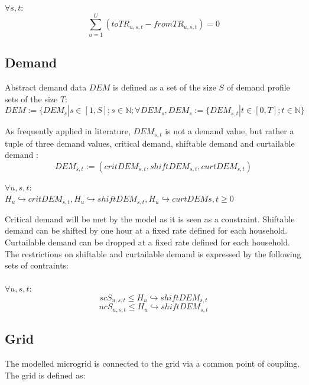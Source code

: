 \documentclass[
	11pt,								%
	DIV10,								%
	a4paper,         					%
	oneside,							%
	headheight=20pt,					%
	footheight=20pt,					%
    parskip=full,						%
    listof=totoc,						%
	bibliography=totoc,					%
	index=totoc,						%
]{scrartcl}
\begin{document}
$\forall s,t$:
\begin{equation}
	\sum_{u = 1}^{U}(toTR_{u,s,t}-fromTR_{u,s,t}) = 0
\end{equation}





\subsection{Demand}
Abstract demand data $DEM$ is defined as a set of the size $S$ of demand profile sets of the size $T$:
\begin{equation}
 DEM:= \{DEM_s | s \in [1,S]; s\in \mathbb{N}; \forall DEM_s, DEM_s := \{DEM_{s,t} | t\in [0,T]; t \in \mathbb{N}\}
\end{equation}

As frequently applied in literature, $DEM_{s,t}$ is not a demand value, but rather a tuple of three demand values, critical demand, shiftable demand and curtailable demand \cite{silvente2015rolling}\cite{zhang2015optimal}\cite{8216436}\cite{7972908} : \\
\begin{equation}
 DEM_{s,t}:= (critDEM_{s,t}, shiftDEM_{s,t}, curtDEM_{s,t}) 
\end{equation}

$\forall u,s,t$:\\
$H_u \hookrightarrow critDEM_{s,t}, H_u \hookrightarrow shiftDEM_{s,t}, H_u \hookrightarrow curtDEM{s,t} \geq 0$

Critical demand will be met by the model as it is seen as a constraint. Shiftable demand can be shifted by one hour at a fixed rate defined for each household. Curtailable demand can be dropped at a fixed rate defined for each household.
The restrictions on shiftable and curtailable demand is expressed by the following sets of contraints:
\\\\
$\forall u,s,t$:
\begin{equation}
	scS_{u,s,t} \leq H_u \hookrightarrow shiftDEM_{s,t}
\end{equation}
\begin{equation}
	ncS_{u,s,t} \leq H_u \hookrightarrow shiftDEM_{s,t}
\end{equation}





\subsection{Grid}
The modelled microgrid is connected to the grid via a common point of coupling. The grid is defined as:
\end{document}
